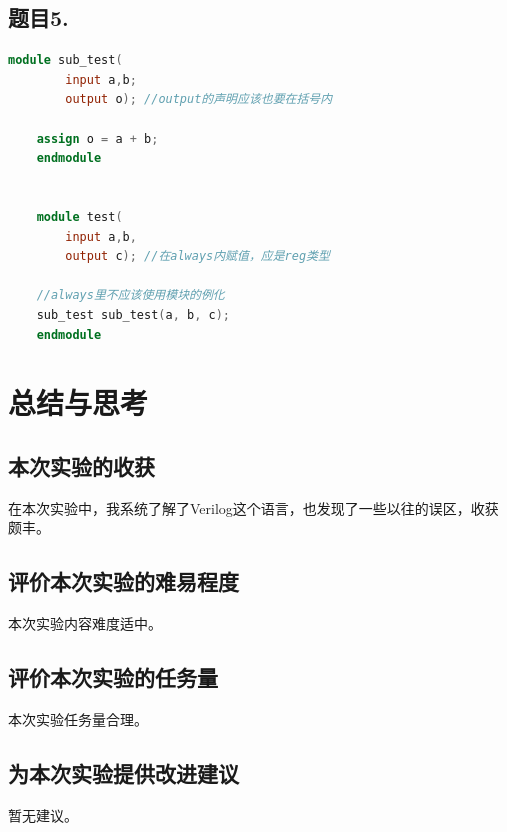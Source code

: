 \documentclass[UTF8]{article}
\begin{document}
	
	
	
	\subsection{题目5.}
	\begin{lstlisting}[language = Verilog]
	module sub_test(
		input a,b;
		output o); //output的声明应该也要在括号内
		
	assign o = a + b;
	endmodule
	
	
	module test(
		input a,b,
		output c); //在always内赋值，应是reg类型
	
	//always里不应该使用模块的例化
	sub_test sub_test(a, b, c);
	endmodule
	\end{lstlisting}
	
	
	\section{总结与思考}
	
	\subsection{本次实验的收获}
	在本次实验中，我系统了解了Verilog这个语言，也发现了一些以往的误区，收获颇丰。\par
	
	\subsection{评价本次实验的难易程度}
	本次实验内容难度适中。\par
	
	\subsection{评价本次实验的任务量}
	本次实验任务量合理。\par
	
	\subsection{为本次实验提供改进建议}
	暂无建议。
	
\end{document}
